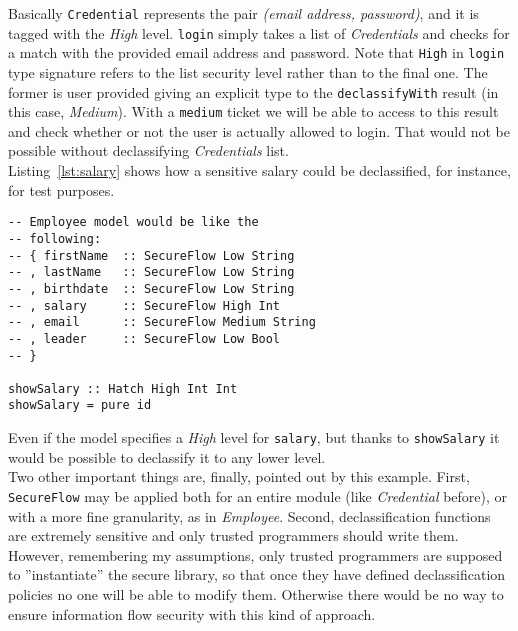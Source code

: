Basically \texttt{Credential} represents the pair \textit{(email address, password)}, and it is tagged with the \textit{High} level. \texttt{login} simply takes a list of \textit{Credentials} and checks for a match with the provided email address and password. Note that \texttt{High} in \texttt{login} type signature refers to the list security level rather than to the final one. The former is user provided giving an explicit type to the \texttt{declassifyWith} result (in this case, \textit{Medium}). With a \texttt{medium} ticket we will be able to access to this result and check whether or not the user is actually allowed to login. That would not be possible without declassifying \textit{Credentials} list. \\
Listing~\ref{lst:salary} shows how a sensitive salary could be declassified, for instance, for test purposes.
\begin{lstlisting}[caption={Declassificated salary}, label={lst:salary}]
-- Employee model would be like the 
-- following:
-- { firstName  :: SecureFlow Low String
-- , lastName   :: SecureFlow Low String
-- , birthdate  :: SecureFlow Low String
-- , salary     :: SecureFlow High Int
-- , email      :: SecureFlow Medium String
-- , leader     :: SecureFlow Low Bool
-- }

showSalary :: Hatch High Int Int
showSalary = pure id 
\end{lstlisting}
Even if the model specifies a \textit{High} level for \texttt{salary}, but thanks to \texttt{showSalary} it would be possible to declassify it to any lower level.\\
Two other important things are, finally, pointed out by this example. First, \texttt{SecureFlow} may be applied both for an entire module (like \textit{Credential} before), or with a more fine granularity, as in \textit{Employee}. Second, declassification functions are extremely sensitive and only trusted programmers should write them. However, remembering my assumptions, only trusted programmers are supposed to ''instantiate'' the secure library, so that once they have defined declassification policies no one will be able to modify them. Otherwise there would be no way to ensure information flow security with this kind of approach.